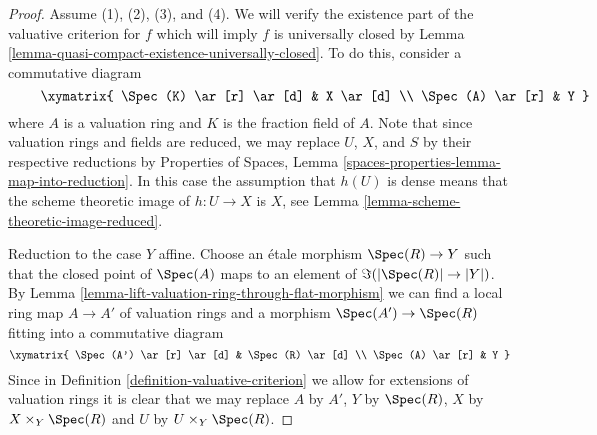 \begin{proof}
Assume (1), (2), (3), and (4).
We will verify the existence part of the valuative criterion for $f$
which will imply $f$ is universally closed by
Lemma \ref{lemma-quasi-compact-existence-universally-closed}.
To do this, consider a commutative diagram
\begin{equation}
\label{equation-start-with}
\vcenter{
\xymatrix{
\Spec(K) \ar[r] \ar[d] & X \ar[d] \\
\Spec(A) \ar[r] & Y
}
}
\end{equation}
where $A$ is a valuation ring and $K$ is the fraction field of $A$.
Note that since valuation rings and fields are reduced, we may
replace $U$, $X$, and $S$ by their respective reductions by
Properties of Spaces, Lemma \ref{spaces-properties-lemma-map-into-reduction}.
In this case the assumption that $h(U)$ is dense means that
the scheme theoretic image of $h : U \to X$ is $X$, see
Lemma \ref{lemma-scheme-theoretic-image-reduced}.

\medskip\noindent
Reduction to the case $Y$ affine. Choose an \'etale morphism
$\Spec(R) \to Y$ such that the closed point of $\Spec(A)$ maps
to an element of $\Im(|\Spec(R)| \to |Y|)$. By
Lemma \ref{lemma-lift-valuation-ring-through-flat-morphism}
we can find a local ring map $A \to A'$ of valuation rings
and a morphism $\Spec(A') \to \Spec(R)$ fitting into a commutative
diagram
$$
\xymatrix{
\Spec(A') \ar[r] \ar[d] & \Spec(R) \ar[d] \\
\Spec(A) \ar[r] & Y
}
$$
Since in Definition \ref{definition-valuative-criterion}
we allow for extensions of valuation rings
it is clear that we may replace $A$ by $A'$, $Y$ by $\Spec(R)$,
$X$ by $X \times_Y \Spec(R)$ and $U$ by $U \times_Y \Spec(R)$.


\end{proof}
